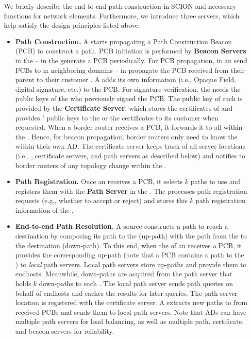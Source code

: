 We briefly describe the end-to-end path construction in SCION and necessary functions for network elements. Furthermore, we introduce three servers, which help satisfy the design principles listed above.
\begin{itemize}
\item {\bf Path Construction. } A \TDC starts propagating a Path Construction
  Beacon (PCB) to construct a path. PCB initiation is performed by {\bf Beacon
    Servers} in the \TDC -- \BSs in the \TDC generate a PCB
  periodically. For PCB propagation, \BSs in an \AD send PCBs to
  \BSs in neighboring domains -- \BSs in \TRAN \ADs
  propagate the PCB received from their parent \AD to their customer \ADs. A
  \BS adds its own \AD information (i.e., Opaque Field, digital
  signature, etc.) to the PCB. For signature verification, the \BS
  needs the public keys of the \AD who previously signed the PCB. The public key
  of each \AD is provided by the {\bf Certificate Server}, which stores the
  certificates of \ADs and provides \ADs' public keys to the \BS or
  the certificates to its customer \ADs when requested. When a border router
  receives a PCB, it forwards it to all \BSs within the \AD. Hence,
  for beacon propagation, border routers only need to know the \BSs
  within their own AD. The certificate server keeps track of all server
  locations (i.e., \BSs, certificate servers, and path servers as
  described below) and notifies to border routers of any topology change within
  the \AD.

\item {\bf Path Registration. } Once an \STUB \AD receives a PCB, it selects $k$
  paths to use and registers them with the {\bf Path Server} in the \TDC. The \TDC \PS
  processes path registration requests (e.g., whether to accept or reject) and
  stores this $k$ path registration information of the \STUB \AD.

\item {\bf End-to-end Path Resolution. }  A source \AD constructs a path to
  reach a destination \AD by composing its path to the \TDC (up-path) with the
  path from the \TDC to the destination \AD (down-path). To this end, when the
  \BS of an \AD receives a PCB, it provides the corresponding up-path (note that
  a PCB contains a path to the \TDC) to {\em local} path servers. Local path
  servers store up-paths and provide them to endhosts. Meanwhile, down-paths are
  acquired from the \TDC path server that holds $k$ down-paths to each \AD. The
  local path server sends path queries on behalf of endhosts and caches the
  results for later queries. The path server location is registered with the
  certificate server. A \BS extracts new paths to \TDC from received PCBs and
  sends them to local path servers. Note that ADs can have multiple path servers
  for load balancing, as well as multiple path, certificate, and beacon servers
  for reliability.


\end{itemize}
